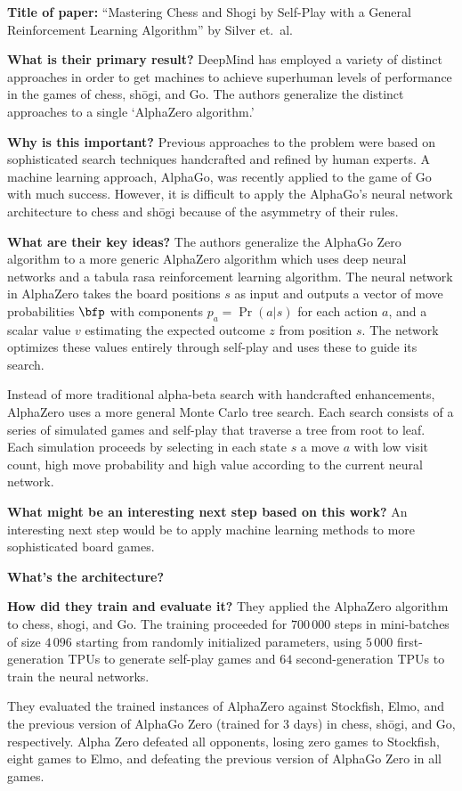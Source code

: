 \noindent \textbf{Title of paper:} ``Mastering Chess and Shogi by Self-Play with a General Reinforcement Learning Algorithm'' by Silver et.\ al.

\noindent\textbf{What is their primary result?} DeepMind has employed a variety
of distinct approaches in order to get machines to achieve superhuman levels of
performance in the games of chess, shōgi, and Go. The authors generalize the
distinct approaches to a single `AlphaZero algorithm.'

\noindent\textbf{Why is this important?} Previous approaches to the problem were
based on sophisticated search techniques handcrafted and refined by human
experts. A machine learning approach, AlphaGo, was recently applied to the game
of Go with much success. However, it is difficult to apply the AlphaGo's
neural network architecture to chess and shōgi because of the asymmetry of their
rules.

\noindent\textbf{What are their key ideas?} The authors generalize the AlphaGo
Zero algorithm to a more generic AlphaZero algorithm which uses deep neural
networks and a tabula rasa reinforcement learning algorithm. The neural network
in AlphaZero takes the board positions $s$ as input and outputs a vector of move
probabilities $\bfp$ with components $p_a=\Pr(a|s)$ for each action $a$, and a
scalar value $v$ estimating the expected outcome $z$ from position $s$. The
network optimizes these values entirely through self-play and uses these to
guide its search.

Instead of more traditional alpha-beta search with handcrafted enhancements,
AlphaZero uses a more general Monte Carlo tree search. Each search consists of a
series of simulated games and self-play that traverse a tree from root to leaf.
Each simulation proceeds by selecting in each state $s$ a move $a$ with low
visit count, high move probability and high value according to the current
neural network.

\noindent\textbf{What might be an interesting next step based on this work?} An
interesting next step would be to apply machine learning methods to more
sophisticated board games.

\noindent\textbf{What's the architecture?}

\noindent\textbf{How did they train and evaluate it?} They applied the AlphaZero
algorithm to chess, shogi, and Go. The training proceeded for $700\,000$ steps
in mini-batches of size $4\,096$ starting from randomly initialized parameters,
using $5\,000$ first-generation TPUs to generate self-play games and $64$
second-generation TPUs to train the neural networks.

They evaluated the trained instances of AlphaZero against Stockfish, Elmo, and
the previous version of AlphaGo Zero (trained for $3$ days) in chess, shōgi, and
Go, respectively. Alpha Zero defeated all opponents, losing zero games to
Stockfish, eight games to Elmo, and defeating the previous version of AlphaGo
Zero in all games.


